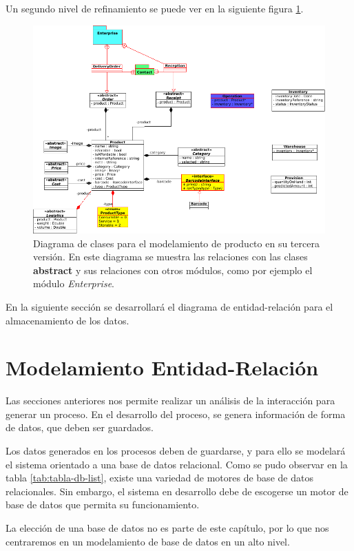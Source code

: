 {Un segundo nivel de refinamiento se puede ver en la siguiente figura \ref{Product-classes-v3}.

\begin{figure}
  \centering
    \includegraphics[scale=0.7]{./Capitulo3/figs/ADDStock-product-v3.png}
  \caption{Diagrama de clases para el modelamiento de producto en su tercera versión. En este diagrama se muestra las relaciones con las clases \textbf{abstract} y sus relaciones con otros módulos, como por ejemplo el módulo \textit{Enterprise}.}
  \label{Product-classes-v3}
\end{figure}

En la siguiente sección se desarrollará el diagrama de entidad-relación para el almacenamiento de los datos.

\section{Modelamiento Entidad-Relación}

Las secciones anteriores nos permite realizar un análisis de la interacción para generar un proceso. En el desarrollo del proceso, se genera información de forma de datos, que deben ser guardados.

Los datos generados en los procesos deben de guardarse, y para ello se modelará el sistema orientado a una base de datos relacional. Como se pudo observar en la tabla \ref{tab:tabla-db-list}, existe una variedad de motores de base de datos relacionales. Sin embargo, el sistema en desarrollo debe de escogerse un motor de base de datos que permita su funcionamiento.

La elección de una base de datos no es parte de este capítulo, por lo que nos centraremos en un modelamiento de base de datos en un alto nivel.

}

